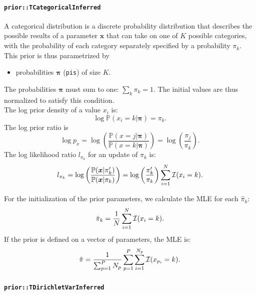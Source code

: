 \documentclass[a4paper,11pt]{article}
\def\bpi{\boldsymbol{\pi}}
\def\p{\mathbb{P}}
\newcommand{\class}[1]{\texttt{#1}}
\newcommand{\privparam}[1]{\texttt{\textunderscore #1}}
\begin{document}
\paragraph{\class{prior::TCategoricalInferred}}\label{categorical}
A categorical distribution is a discrete probability distribution that describes the possible results of a parameter $\boldsymbol x$ that can take on one of $K$ possible categories, with the probability of each category separately specified by a probability $\pi_k$. This prior is thus parametrized by
\begin{itemize}
 \item probabilities $\bpi$ (\privparam{pis}) of size $K$.
\end{itemize}
The probabilities $\bpi$ must sum to one: $\sum_k \pi_k = 1$. The initial values are thus normalized to satisfy this condition.\\
The log prior density of a value $x_i$ is:
\begin{equation*}
 \log \p(x_i = k | \bpi) = \pi_k.
\end{equation*}
The log prior ratio is
\begin{equation*}
 \log p_x = \log \left( \frac{\p(x = j | \bpi)}{\p(x=k|\bpi)} \right) = \log \left( \frac{\pi_j}{\pi_k} \right).
\end{equation*}
The log likelihood ratio $l_{\pi_k}$ for an update of $\pi_k$ is:
\begin{equation*}
 l_{\pi_k} = \log \left(\frac{\p(\boldsymbol x | \pi_k')}{\p(\boldsymbol x | \pi_k)} \right) = \log \left( \frac{\pi_k'}{\pi_k} \right) \sum_{i=1}^N {\cal I}(x_i = k).
\end{equation*}

For the initialization of the prior parameters, we calculate the MLE for each $\hat \pi_k$:
\begin{equation*}
 \hat \pi_k = \frac{1}{N}\sum_{i=1}^N {\cal I}(x_i = k).
\end{equation*}
If the prior is defined on a vector of parameters, the MLE is:
\begin{equation*}
 \hat \pi = \frac{1}{\sum_{p=1}^P N_p}\sum_{p=1}^P \sum_{i=1}^{N_p} {\cal I}(x_{p_i} = k).
\end{equation*}

\paragraph{\class{prior::TDirichletVarInferred}}
\end{document}
